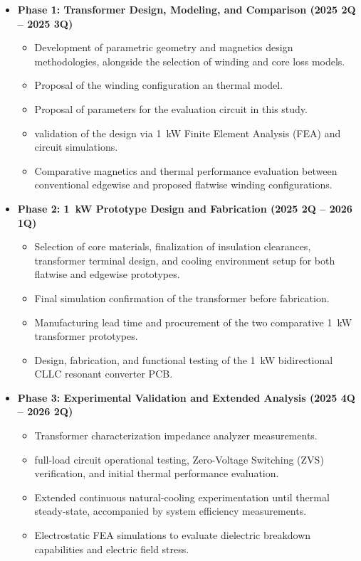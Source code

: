 \begin{itemize}
    \item \textbf{Phase 1: Transformer Design, Modeling, and Comparison (2025 2Q -- 2025 3Q)}
    \begin{itemize}
        \item Development of parametric geometry and magnetics design methodologies, alongside the selection of winding and core loss models.
        \item Proposal of the winding configuration an thermal model.
        \item Proposal of parameters for the evaluation circuit in this study.
        \item validation of the design via 1~kW Finite Element Analysis (FEA) and circuit simulations.
        \item Comparative magnetics and thermal performance evaluation between conventional edgewise and proposed flatwise winding configurations.
    \end{itemize}
    
    \item \textbf{Phase 2: 1~kW Prototype Design and Fabrication (2025 2Q -- 2026 1Q)}
    \begin{itemize}
        \item Selection of core materials, finalization of insulation clearances, transformer terminal design, and cooling environment setup for both flatwise and edgewise prototypes.
        \item Final simulation confirmation of the transformer before fabrication.
        \item Manufacturing lead time and procurement of the two comparative 1~kW transformer prototypes.
        \item Design, fabrication, and functional testing of the 1~kW bidirectional CLLC resonant converter PCB.
    \end{itemize}

    \item \textbf{Phase 3: Experimental Validation and Extended Analysis (2025 4Q -- 2026 2Q)}
    \begin{itemize}
        \item Transformer characterization impedance analyzer measurements.
        \item full-load circuit operational testing, Zero-Voltage Switching (ZVS) verification, and initial thermal performance evaluation.
        \item Extended continuous natural-cooling experimentation until thermal steady-state, accompanied by system efficiency measurements.
        \item Electrostatic FEA simulations to evaluate dielectric breakdown capabilities and electric field stress.
    \end{itemize}


\end{itemize}
